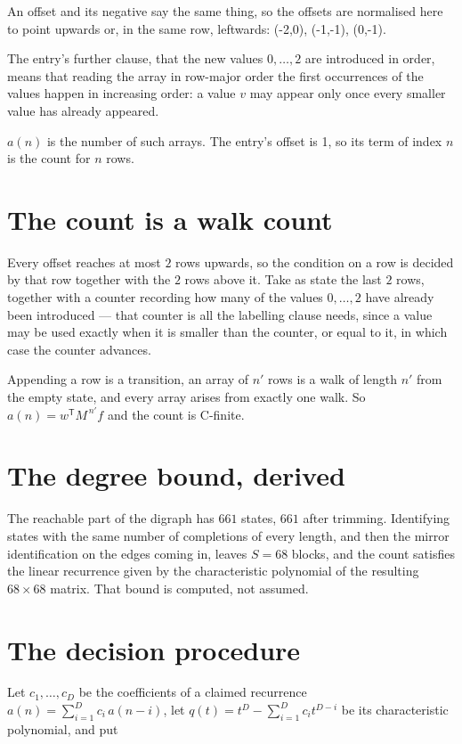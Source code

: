 \documentclass[11pt]{article}
\theoremstyle{definition}
\begin{document}
An offset and its negative say the same thing, so the offsets are normalised here to point upwards or, in the same row, leftwards: (-2,0), (-1,-1), (0,-1).

The entry's further clause, that the new values $0,\dots,2$ are introduced in order, means that reading the array in row-major order the first occurrences of the values happen in increasing order: a value $v$ may appear only once every smaller value has already appeared.

$a(n)$ is the number of such arrays. The entry's offset is 1, so its term of index $n$ is the count for $n$ rows.

\section{The count is a walk count}

Every offset reaches at most $2$ rows upwards, so the condition on a row is decided by that row together with the $2$ rows above it. Take as state the last $2$ rows, together with a counter recording how many of the values $0,\dots,2$ have already been introduced --- that counter is all the labelling clause needs, since a value may be used exactly when it is smaller than the counter, or equal to it, in which case the counter advances.

Appending a row is a transition, an array of $n'$ rows is a walk of length $n'$ from the empty state, and every array arises from exactly one walk. So $a(n) = w^{\mathsf T}M^{\,n'}f$ and the count is C-finite.

\section{The degree bound, derived}

The reachable part of the digraph has $661$ states, $661$ after trimming. Identifying states with the same number of completions of every length, and then the mirror identification on the edges coming in, leaves $S = 68$ blocks, and the count satisfies the linear recurrence given by the characteristic polynomial of the resulting $68\times68$ matrix. That bound is computed, not assumed.

\section{The decision procedure}

Let $c_1,\dots,c_D$ be the coefficients of a claimed recurrence $a(n) = \sum_{i=1}^{D} c_i\,a(n-i)$, let $q(t) = t^{D} - \sum_{i=1}^{D} c_i t^{D-i}$ be its characteristic polynomial, and put
\end{document}
